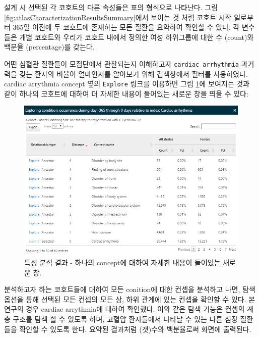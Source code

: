\documentclass[11pt]{book}
\theoremstyle{definition}
\theoremstyle{definition}
\theoremstyle{definition}
\theoremstyle{remark}
\begin{document}
설계 시 선택된 각 코호트의 다른 속성들은 표의 형식으로 나타난다. 그림
\ref{fig:atlasCharacterizationResultsSummary}에서 보이는 것 처럼 코호트
시작 일로부터 365일 이전에 두 코호트에 존재하는 모든 질환을 요약하여
확인할 수 있다. 각 변수들은 개별 코호트와 우리가 코호트 내에서 정의한
여성 하위그룹에 대한 수 (count)와 백분율 (percentage)를 갖는다.

어떤 심혈관 질환들이 모집단에서 관찰되는지 이해하고자
\texttt{cardiac\ arrhythmia} 과거력을 갖는 환자의 비율이 얼마인지를
알아보기 위해 겁색창에서 필터를 사용하였다. cardiac arrythmia concept
옆의 \texttt{Explore} 링크를 이용하면 그림
\ref{fig:atlasCharacterizationResultsExplore}에 보여지는 것과 같이
하나의 코호트에 대하여 더 자세한 내용이 들어있는 새로운 창을 띄울 수
있다:

\begin{figure}

{\centering \includegraphics[width=1\linewidth]{images/Characterization/atlasCharacterizationResultsExplore} 

}

\caption{특성 분석 결과 - 하나의 concept에 대하여 자세한 내용이 들어있는 새로운 창.}\label{fig:atlasCharacterizationResultsExplore}
\end{figure}

분석하고자 하는 코호트들에 대하여 모든 conition에 대한 컨셉을 분석하고
나면, 탐색 옵션을 통해 선택된 모든 컨셉의 모든 상, 하위 관계에 있는
컨셉을 확인할 수 있다. 본 연구의 경우 cardiac arrythmia에 대하여
확인했다. 이와 같은 탐색 기능은 컨셉의 계층 구조를 탐색 할 수 있도록
하며, 고혈압 환자들에서 나타날 수 있는 다른 심장 질환들을 확인할 수
있도록 한다. 요약된 결과처럼 (갯)수와 백분율로써 화면에 출력된다.
\end{document}
